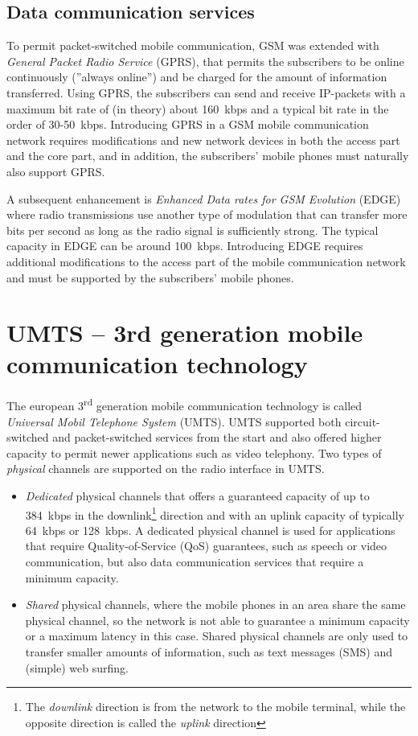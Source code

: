\subsection{Data communication services}
To permit packet-switched mobile communication, GSM was extended with \emph{General Packet Radio Service} (GPRS), that permits the subscribers to be online continuously (''always online'') and be charged for the amount of information transferred. Using GPRS, the subscribers can send and receive IP-packets with a maximum bit rate of (in theory) about 160~kbps and a typical bit rate in the order of 30-50~kbps. Introducing GPRS in a GSM mobile communication network requires modifications and new network devices in both the access part and the core part, and in addition, the subscribers' mobile phones must naturally also support GPRS.

A subsequent enhancement is \emph{Enhanced Data rates for GSM Evolution} (EDGE) where radio transmissions use another type of modulation that can transfer more bits per second as long as the radio signal is sufficiently strong. The typical capacity in EDGE can be around 100~kbps. Introducing EDGE requires additional modifications to the access part of the mobile communication network and must be supported by the subscribers' mobile phones.

\section{UMTS -- 3rd generation mobile communication technology}
The european 3\textsuperscript{rd} generation mobile communication technology is called \emph{Universal Mobil Telephone System} (UMTS). UMTS supported both circuit-switched and packet-switched services from the start and also offered higher capacity to permit newer applications such as video telephony. Two types of \emph{physical} channels are supported on the radio interface in UMTS.
\begin{itemize}
%
\item \emph{Dedicated} physical channels that offers a guaranteed capacity of up to 384~kbps in the downlink\footnote{The \emph{downlink} direction is from the network to the mobile terminal, while the opposite direction is called the \emph{uplink} direction} direction and with an uplink capacity of typically 64~kbps or 128~kbps. A dedicated physical channel is used for applications that require Quality-of-Service (QoS) guarantees, such as speech or video communication, but also data communication services that require a minimum capacity.
%
\item \emph{Shared} physical channels, where the mobile phones in an area share the same physical channel, so the network is not able to guarantee a minimum capacity or a maximum latency in this case. Shared physical channels are only used to transfer smaller amounts of information, such as text messages (SMS) and (simple) web surfing.
%
\end{itemize}

